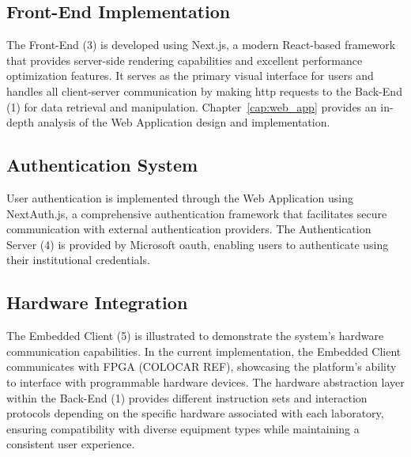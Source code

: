 \subsection*{Front-End Implementation}
The Front-End (3) is developed using Next.js, a modern React-based framework that provides server-side rendering capabilities and excellent performance optimization features. It serves as the primary visual interface for users and handles all client-server communication by making \ac{http} requests to the Back-End (1) for data retrieval and manipulation. Chapter~\ref{cap:web_app} provides an in-depth analysis of the Web Application design and implementation.

\subsection*{Authentication System}
User authentication is implemented through the Web Application using NextAuth.js, a comprehensive authentication framework that facilitates secure communication with external authentication providers. The Authentication Server (4) is provided by Microsoft \ac{oauth}, enabling users to authenticate using their institutional credentials.

\subsection*{Hardware Integration}
The Embedded Client (5) is illustrated to demonstrate the system's hardware communication capabilities. In the current implementation, the Embedded Client communicates with FPGA (COLOCAR REF), showcasing the platform's ability to interface with programmable hardware devices. The hardware abstraction layer within the Back-End (1) provides different instruction sets and interaction protocols depending on the specific hardware associated with each laboratory, ensuring compatibility with diverse equipment types while maintaining a consistent user experience.